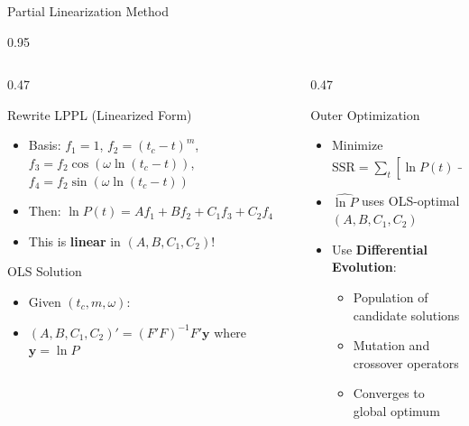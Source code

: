 \documentclass[9pt, aspectratio=169, t]{beamer}
\begin{document}
\begin{frame}{Partial Linearization Method}
    \begin{cminipage}{0.95\textwidth}
    {\scriptsize
    \begin{columns}[T]
        \begin{column}{0.47\textwidth}
            \begin{block}{Rewrite LPPL (Linearized Form)}
                \begin{itemize}\setlength{\itemsep}{1pt}
                    \item Basis: $f_1 = 1$, $f_2 = (t_c - t)^m$, $f_3 = f_2\cos(\omega\ln(t_c-t))$, $f_4 = f_2\sin(\omega\ln(t_c-t))$
                    \item Then: $\ln P(t) = Af_1 + Bf_2 + C_1 f_3 + C_2 f_4$
                    \item This is \textbf{linear} in $(A, B, C_1, C_2)$!
                \end{itemize}
            \end{block}

            \begin{exampleblock}{OLS Solution}
                \begin{itemize}\setlength{\itemsep}{0pt}
                    \item Given $(t_c, m, \omega)$:
                    \item $(A, B, C_1, C_2)' = (F'F)^{-1}F'\mathbf{y}$ where $\mathbf{y} = \ln P$
                \end{itemize}
            \end{exampleblock}
        \end{column}
        \begin{column}{0.47\textwidth}
            \begin{alertblock}{Outer Optimization}
                \begin{itemize}\setlength{\itemsep}{0pt}
                    \item Minimize $\text{SSR} = \sum_t [\ln P(t) - \widehat{\ln P}(t)]^2$
                    \item $\widehat{\ln P}$ uses OLS-optimal $(A, B, C_1, C_2)$
                    \item Use \textbf{Differential Evolution}:
                    \begin{itemize}\setlength{\itemsep}{0pt}
                        \item Population of candidate solutions
                        \item Mutation and crossover operators
                        \item Converges to global optimum
                    \end{itemize}
                \end{itemize}
            \end{alertblock}


\end{column}
\end{columns}}
\end{cminipage}
\end{frame}
\end{document}

